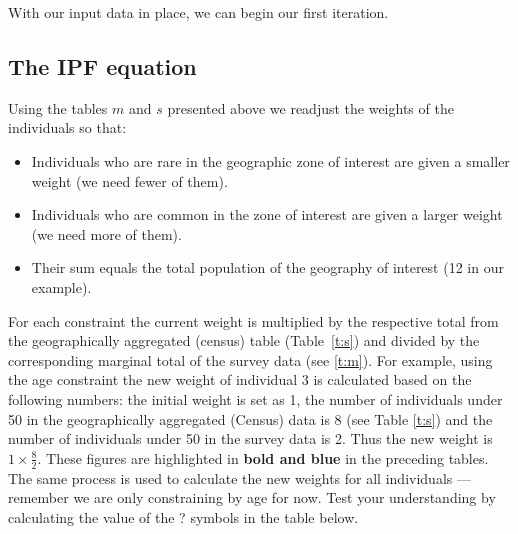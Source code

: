 \documentclass[a4paper, 11pt, twoside]{article}
\begin{document}
With our input data in place, we can begin our first iteration.

\subsection{The IPF equation} \label{ipfeq}


Using the tables $m$ and $s$ presented above we readjust the weights of the
individuals so that:

\begin{itemize}
  \item Individuals who are rare in the geographic zone of interest are given a smaller weight (we need fewer of them).
  \item Individuals who are common in the zone of interest are given a larger weight (we need more of them).
  \item Their sum equals the total population of the geography of interest (12 in our example).
\end{itemize}

For each constraint the current weight is multiplied by the respective
total from the geographically aggregated (census) table (Table~\ref{t:s}) and
divided by the corresponding marginal total of the survey data (see \cref{t:m}).
For example, using the age constraint the new weight of individual 3 is calculated
based on the following numbers: the initial weight is set as 1, the number of
individuals under 50 in the geographically aggregated (Census) data is 8 (see Table \ref{t:s})
and the number
of individuals under 50 in the survey data is 2. Thus the new weight is
$1 \times \frac{8}{2}$. These figures
are highlighted in \textbf{\color{blue}bold and blue} in the preceding tables.
The same process is used to calculate the new weights for all individuals --- remember
we are only constraining by age for now. Test your understanding by calculating
the value of the ? symbols in the table below.

\end{document}
